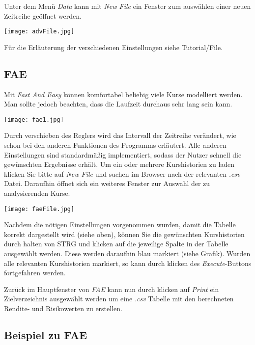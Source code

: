 \documentclass{scrartcl}
\begin{document}
Unter dem Menü \textit{Data} kann mit \textit{New File} ein Fenster zum auswählen einer neuen Zeitreihe geöffnet werden.

\begin{center}
\texttt{[image: advFile.jpg]}
\end{center}

Für die Erläuterung der verschiedenen Einstellungen siehe Tutorial/File.

\subsection{FAE}

Mit \textit{Fast And Easy} können komfortabel beliebig viele Kurse modelliert werden. Man sollte jedoch beachten, dass die Laufzeit durchaus sehr lang sein kann.

\begin{center}
\texttt{[image: fae1.jpg]}
\end{center}

Durch verschieben des Reglers wird das Intervall der Zeitreihe verändert, wie schon bei den anderen Funktionen des Programms erläutert. Alle anderen Einstellungen sind standardmäßig implementiert, sodass der Nutzer schnell die gewünschten Ergebnisse erhält. Um ein oder mehrere Kurshistorien zu laden klicken Sie bitte auf \textit{New File} und suchen im Browser nach der relevanten \textit{.csv} Datei. Daraufhin öffnet sich ein weiteres Fenster zur Auswahl der zu analysierenden Kurse.

\begin{center}
\texttt{[image: faeFile.jpg]}
\end{center}

Nachdem die nötigen Einstellungen vorgenommen wurden, damit die Tabelle korrekt dargestellt wird (siehe oben), können Sie die gewünschten Kurshistorien durch halten von STRG und klicken auf die jeweilige Spalte in der Tabelle ausgewählt werden. Diese werden daraufhin blau markiert (siehe Grafik). Wurden alle relevanten Kurshistorien markiert, so kann durch klicken des \textit{Execute}-Buttons fortgefahren werden.

Zurück im Hauptfenster von \textit{FAE} kann nun durch klicken auf \textit{Print} ein Zielverzeichnis ausgewählt werden um eine \textit{.csv} Tabelle mit den berechneten Rendite- und Risikowerten zu erstellen. 

\subsection{Beispiel zu FAE}
\end{document}
